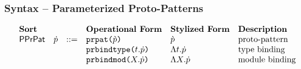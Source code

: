 \subsubsection{Syntax -- Parameterized Proto-Patterns}
\[\begin{array}{lllllll}
\textbf{Sort} & & & \textbf{Operational Form} & \textbf{Stylized Form} & \textbf{Description}\\
\mathsf{PPrPat} & \pcp & ::= & \apcepat{\cpv} & {\cpv} & \text{proto-pattern}\\
&&& \apcebindtype{t}{\pcp} & \pcebindtype{t}{\pcp} & \text{type binding}\\
&&& \apcebindmod{X}{\pcp} & \pcebindmod{X}{\pcp} & \text{module binding}%
\end{array}\]

